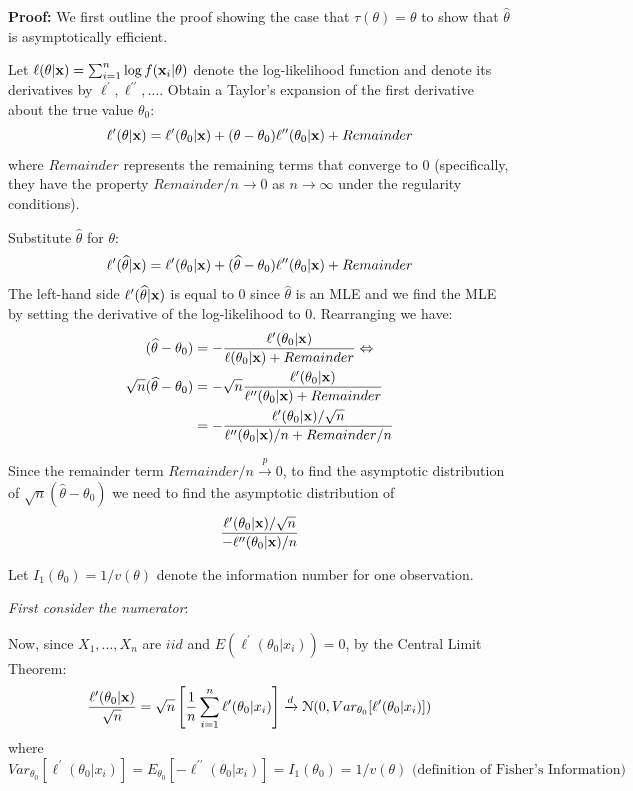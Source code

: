 \documentclass[11pt,]{article}
\newcommand{\Xndots}{X_1, \ldots, X_n}
\def\bx{{\bf x}}
\def\thetahat{{\widehat\theta}}
\def\Nsc{{\cal N}}
\def\sumin{\sum_{i=1}^n}
\begin{document}
\noindent\textbf{Proof:} We first outline the proof showing the case
that \(\tau(\theta) = \theta\) to show that \(\thetahat\) is
asymptotically efficient.

Let \(\ell(\theta|\bx) = \sumin \log f(\bx_i |\theta)\) denote the
log-likelihood function and denote its derivatives by
\(\ell^\prime, \ell^{\prime\prime}, \ldots\). Obtain a Taylor's
expansion of the first derivative about the true value \(\theta_0\):
\[\ell^\prime(\theta|\bx) = \ell^\prime(\theta_0 | \bx) + (\theta - \theta_0) \ell^{\prime\prime}(\theta_0 |\bx) + Remainder\]
where \(Remainder\) represents the remaining terms that converge to 0
(specifically, they have the property \(Remainder/n \to 0\) as
\(n\to \infty\) under the regularity conditions).

Substitute \(\thetahat\) for \(\theta\):
\[\ell^\prime(\thetahat|\bx) = \ell^\prime(\theta_0 | \bx) + (\thetahat - \theta_0) \ell^{\prime\prime}(\theta_0 |\bx) + Remainder\]
The left-hand side \(\ell^\prime(\thetahat|\bx)\) is equal to 0 since
\(\thetahat\) is an MLE and we find the MLE by setting the derivative of
the log-likelihood to 0. Rearranging we have: \begin{align*}
(\thetahat - \theta_0) &= -\frac{\ell^\prime(\theta_0 | \bx)}{\ell(\theta_0 | \bx) + Remainder} \Leftrightarrow\\
\sqrt{n} (\thetahat - \theta_0)&= -\sqrt{n} \frac{\ell^\prime(\theta_0 | \bx)}{\ell^{\prime\prime}(\theta_0 | \bx)+Remainder}\\
&= - \frac{\ell^\prime(\theta_0 | \bx)/\sqrt{n}}{\ell^{\prime\prime}(\theta_0 | \bx)/n + Remainder/n}
\end{align*}

Since the remainder term \(Remainder/n \xrightarrow{p} 0\), to find the
asymptotic distribution of \(\sqrt{n}(\thetahat - \theta_0)\) we need to
find the asymptotic distribution of
\[\frac{\ell^\prime(\theta_0 | \bx)/\sqrt{n}}{-\ell^{\prime\prime}(\theta_0 | \bx)/n}\]

Let \(I_1(\theta_0) = 1/v(\theta)\) denote the information number for
one observation.

\emph{First consider the numerator}:

Now, since \(\Xndots\) are \(iid\) and
\(E(\ell^\prime(\theta_0|x_i)) = 0\), by the Central Limit Theorem:
\[\frac{\ell^\prime(\theta_0 | \bx)}{\sqrt{n}} = \sqrt{n} \left[\frac{1}{n} \sumin \ell^\prime(\theta_0|x_i)\right] \xrightarrow{d} \Nsc(0, Var_{\theta_0}[\ell^\prime(\theta_0|x_i)])\]
where
\[Var_{\theta_0}[\ell^\prime(\theta_0|x_i)] = E_{\theta_0} [-\ell^{\prime\prime}(\theta_0 |x_i)] = I_1(\theta_0) = 1/v(\theta) \mbox{ (definition of Fisher's Information)}\]
\end{document}

